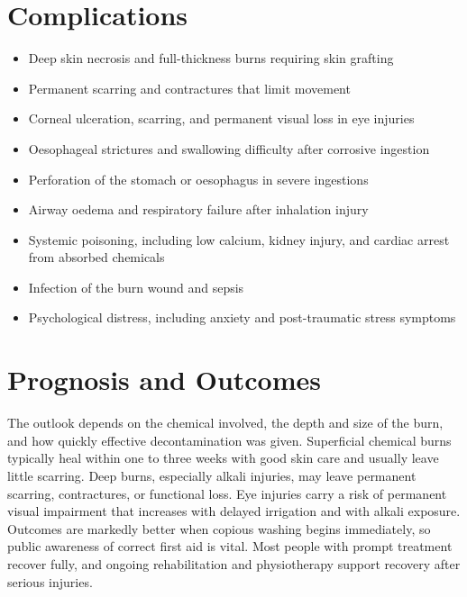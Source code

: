 \section*{Complications}
\begin{itemize}
    \item Deep skin necrosis and full-thickness burns requiring skin grafting
    \item Permanent scarring and contractures that limit movement
    \item Corneal ulceration, scarring, and permanent visual loss in eye injuries
    \item Oesophageal strictures and swallowing difficulty after corrosive ingestion
    \item Perforation of the stomach or oesophagus in severe ingestions
    \item Airway oedema and respiratory failure after inhalation injury
    \item Systemic poisoning, including low calcium, kidney injury, and cardiac arrest from absorbed chemicals
    \item Infection of the burn wound and sepsis
    \item Psychological distress, including anxiety and post-traumatic stress symptoms
\end{itemize}

\section*{Prognosis and Outcomes}
The outlook depends on the chemical involved, the depth and size of the burn, and how quickly effective decontamination was given. Superficial chemical burns typically heal within one to three weeks with good skin care and usually leave little scarring. Deep burns, especially alkali injuries, may leave permanent scarring, contractures, or functional loss. Eye injuries carry a risk of permanent visual impairment that increases with delayed irrigation and with alkali exposure. Outcomes are markedly better when copious washing begins immediately, so public awareness of correct first aid is vital. Most people with prompt treatment recover fully, and ongoing rehabilitation and physiotherapy support recovery after serious injuries.

